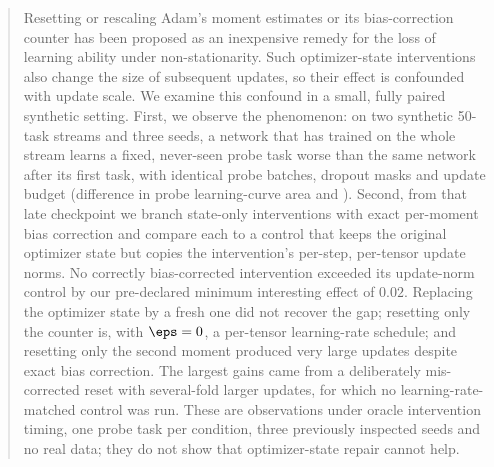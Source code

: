 \begin{abstract}
Resetting or rescaling Adam's moment estimates or its bias-correction counter has been proposed as an
inexpensive remedy for the loss of learning ability under non-stationarity. Such optimizer-state
interventions also change the size of subsequent updates, so their effect is confounded with update
scale. We examine this confound in a small, fully paired synthetic setting. First, we observe the
phenomenon: on two synthetic 50-task streams and three seeds, a network that has trained on the whole
stream learns a fixed, never-seen probe task worse than the same network after its first task, with
identical probe batches, dropout masks and update budget (difference in probe learning-curve area
\RTLateMinusEarlyAuc{} and \LPLateMinusEarlyAuc{}). Second, from that late checkpoint we branch
state-only interventions with exact per-moment bias correction and compare each to a control that keeps
the original optimizer state but copies the intervention's per-step, per-tensor update norms. No
correctly bias-corrected intervention exceeded its update-norm control by our pre-declared minimum
interesting effect of $0.02$. Replacing the optimizer state by a fresh one did not recover the gap;
resetting only the counter is, with $\eps=0$, a per-tensor learning-rate schedule; and resetting only the
second moment produced very large updates despite exact bias correction. The largest gains came from a
deliberately mis-corrected reset with several-fold larger updates, for which no learning-rate-matched
control was run. These are observations under oracle intervention timing, one probe task per condition,
three previously inspected seeds and no real data; they do not show that optimizer-state repair cannot help.
\end{abstract}

